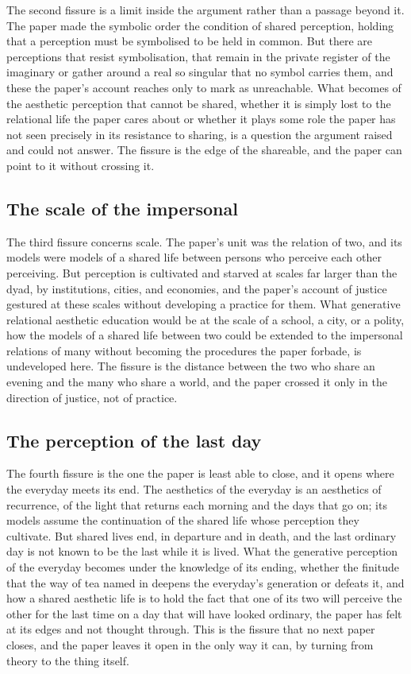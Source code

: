 The second fissure is a limit inside the argument rather than a passage beyond it. The paper made the symbolic order the condition of shared perception, holding that a perception must be symbolised to be held in common. But there are perceptions that resist symbolisation, that remain in the private register of the imaginary or gather around a real so singular that no symbol carries them, and these the paper's account reaches only to mark as unreachable. What becomes of the aesthetic perception that cannot be shared, whether it is simply lost to the relational life the paper cares about or whether it plays some role the paper has not seen precisely in its resistance to sharing, is a question the argument raised and could not answer. The fissure is the edge of the shareable, and the paper can point to it without crossing it.

\subsection{The scale of the impersonal}
\label{p23:sub:fiss-scale}

The third fissure concerns scale. The paper's unit was the relation of two, and its models were models of a shared life between persons who perceive each other perceiving. But perception is cultivated and starved at scales far larger than the dyad, by institutions, cities, and economies, and the paper's account of justice gestured at these scales without developing a practice for them. What generative relational aesthetic education would be at the scale of a school, a city, or a polity, how the models of a shared life between two could be extended to the impersonal relations of many without becoming the procedures the paper forbade, is undeveloped here. The fissure is the distance between the two who share an evening and the many who share a world, and the paper crossed it only in the direction of justice, not of practice.

\subsection{The perception of the last day}
\label{p23:sub:fiss-finitude}

The fourth fissure is the one the paper is least able to close, and it opens where the everyday meets its end. The aesthetics of the everyday is an aesthetics of recurrence, of the light that returns each morning and the days that go on; its models assume the continuation of the shared life whose perception they cultivate. But shared lives end, in departure and in death, and the last ordinary day is not known to be the last while it is lived. What the generative perception of the everyday becomes under the knowledge of its ending, whether the finitude that the way of tea named in  deepens the everyday's generation or defeats it, and how a shared aesthetic life is to hold the fact that one of its two will perceive the other for the last time on a day that will have looked ordinary, the paper has felt at its edges and not thought through. This is the fissure that no next paper closes, and the paper leaves it open in the only way it can, by turning from theory to the thing itself.

